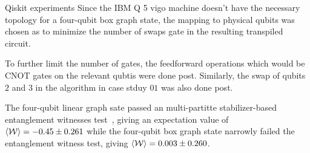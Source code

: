 \documentclass[final]{beamer}
\newlength{\colwidth}
\begin{document}
\begin{frame}[t]
\begin{columns}[t]
\begin{column}{\colwidth}
\begin{block}{Qiskit experiments}
                    Since the IBM Q 5 vigo machine doesn't have the necessary
                    topology for a four-qubit box graph state, the
                    mapping to physical qubits was chosen as to minimize the
                    number of swaps gate in the resulting transpiled circuit.

                    To further limit the number of gates, the feedforward
                    operations which would be CNOT gates on the
                    relevant qubtis were done post. Similarly, the swap of
                    qubits $2$ and $3$ in the algorithm in case stduy $01$ was
                    also done post.

                    The four-qubit linear graph sate passed an multi-partitte
                    stabilizer-based entanglement witnesses
                    test~\cite{PhysRevA.72.022340}, giving an expectation value of
                    $\expval{\mathcal{W}} = -0.45 \pm 0.261$ while the four-qubit
                    box graph state narrowly failed the entanglement witness
                    test, giving $\expval{\mathcal{W}} = 0.003 \pm 0.260$.


\end{block}
\end{column}
\end{columns}
\end{frame}
\end{document}
